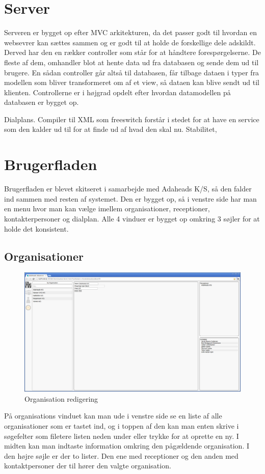 \section{Server}
Serveren er bygget op efter MVC arkitekturen, da det passer godt til hvordan en websevrer kan sættes sammen og er godt til at holde de forskellige dele adskildt. Derved har den en rækker controller som står for at håndtere forespørgelserne. De fleste af dem, omhandler blot at hente data ud fra databasen og sende dem ud til brugere. En sådan controller går altså til databasen, får tilbage dataen i typer fra modellen som bliver transformeret om af et view, så dataen kan blive sendt ud til klienten.
Controllerne er i højgrad opdelt efter hvordan datamodellen på databasen er bygget op. 

Dialplans. Compiler til XML som freeswitch forstår i stedet for at have en service som den kalder ud til for at finde ud af hvad den skal nu. Stabilitet, 

\section{Brugerfladen}
Brugerfladen er blevet skitseret i samarbejde med Adaheads K/S, så den falder ind sammen med resten af systemet.
Den er bygget op, så i venstre side har man en menu hvor man kan vælge imellem organisationer, receptioner, kontakterpersoner og dialplan. Alle 4 vinduer er bygget op omkring 3 søjler for at holde det konsistent.

\subsection{Organisationer}
\begin{figure}[ht!]
\centering
\includegraphics[width=\textwidth]{images/screen_org.png}
\caption{Organisation redigering}
\label{fig:screenorg}
\end{figure}
På organisations vinduet kan man ude i venstre side se en liste af alle organisationer som er tastet ind, og i toppen af den kan man enten skrive i søgefelter som filetere listen neden under eller trykke for at oprette en ny. I midten kan man indtaste information omkring den pågældende organisation. I den højre søjle er der to lister. Den ene med receptioner og den anden med kontaktpersoner der til hører den valgte organisation.

